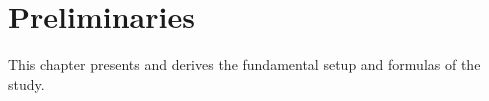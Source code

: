 \chapter{Preliminaries}

This chapter presents and derives the fundamental setup and formulas of the study. 




